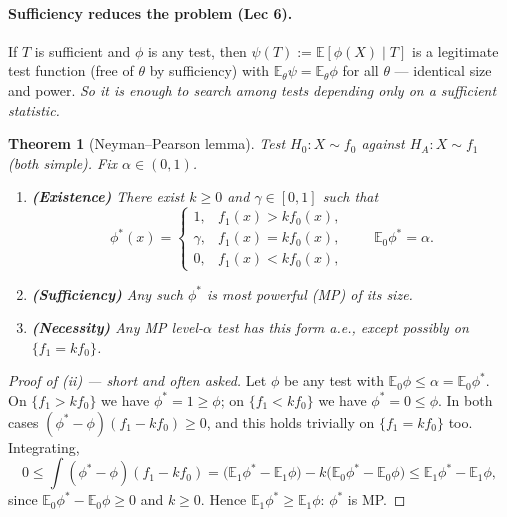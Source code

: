 \documentclass[11pt]{article}
\newtheorem{theorem}{Theorem}[section]
\theoremstyle{remark}
\newcommand{\E}{\mathbb{E}}
\begin{document}
\paragraph{Sufficiency reduces the problem (Lec 6).} If $T$ is sufficient and $\phi$ is any
test, then $\psi(T):=\E[\phi(X)\mid T]$ is a legitimate test function (free of $\theta$ by
sufficiency) with $\E_\theta\psi=\E_\theta\phi$ for all $\theta$ --- identical size and power.
\emph{So it is enough to search among tests depending only on a sufficient statistic.}

\begin{theorem}[Neyman--Pearson lemma]
Test $H_0: X\sim f_0$ against $H_A: X\sim f_1$ (both simple). Fix $\alpha\in(0,1)$.
\begin{enumerate}[label=(\roman*)]
\item \textbf{(Existence)} There exist $k\ge0$ and $\gamma\in[0,1]$ such that
\[
\phi^*(x)=\begin{cases}
1, & f_1(x)>k f_0(x),\\
\gamma, & f_1(x)=k f_0(x),\\
0, & f_1(x)<k f_0(x),
\end{cases}
\qquad \E_{0}\phi^*=\alpha .
\]
\item \textbf{(Sufficiency)} Any such $\phi^*$ is most powerful (MP) of its size.
\item \textbf{(Necessity)} Any MP level-$\alpha$ test has this form a.e., except possibly on
$\{f_1=kf_0\}$.
\end{enumerate}
\end{theorem}

\begin{proof}[Proof of (ii) --- short and often asked]
Let $\phi$ be any test with $\E_0\phi\le\alpha=\E_0\phi^*$. On $\{f_1>kf_0\}$ we have
$\phi^*=1\ge\phi$; on $\{f_1<kf_0\}$ we have $\phi^*=0\le\phi$. In both cases
$(\phi^*-\phi)(f_1-kf_0)\ge0$, and this holds trivially on $\{f_1=kf_0\}$ too. Integrating,
\[
0\le\int(\phi^*-\phi)(f_1-kf_0)=\big(\E_1\phi^*-\E_1\phi\big)-k\big(\E_0\phi^*-\E_0\phi\big)
\le \E_1\phi^*-\E_1\phi,
\]
since $\E_0\phi^*-\E_0\phi\ge0$ and $k\ge0$. Hence $\E_1\phi^*\ge\E_1\phi$: $\phi^*$ is MP.
\end{proof}
\end{document}
